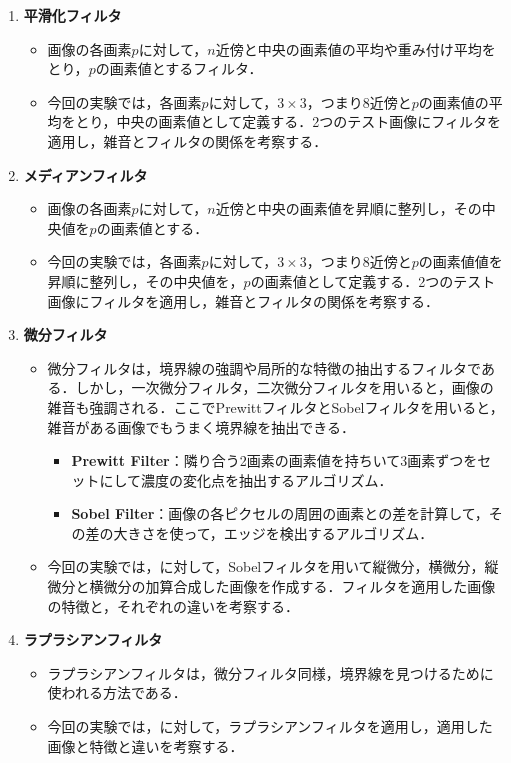 \begin{enumerate}
    \item \textbf{平滑化フィルタ}
          \begin{itemize}
              \item 画像の各画素\(p\)に対して，\(n\)近傍と中央の画素値の平均や重み付け平均をとり，\(p\)の画素値とするフィルタ．
              \item 今回の実験では，各画素\(p\)に対して，\(3\times 3\)，つまり8近傍と\(p\)の画素値の平均をとり，中央の画素値として定義する．2つのテスト画像にフィルタを適用し，雑音とフィルタの関係を考察する．
          \end{itemize}
    \item \textbf{メディアンフィルタ}
          \begin{itemize}
              \item 画像の各画素\(p\)に対して，\(n\)近傍と中央の画素値を昇順に整列し，その中央値を\(p\)の画素値とする．
              \item 今回の実験では，各画素\(p\)に対して，\(3\times 3\)，つまり8近傍と\(p\)の画素値値を昇順に整列し，その中央値を，\(p\)の画素値として定義する．2つのテスト画像にフィルタを適用し，雑音とフィルタの関係を考察する．
          \end{itemize}
    \item \textbf{微分フィルタ}
          \begin{itemize}
              \item 微分フィルタは，境界線の強調や局所的な特徴の抽出するフィルタである．しかし，一次微分フィルタ，二次微分フィルタを用いると，画像の雑音も強調される．ここでPrewittフィルタとSobelフィルタを用いると，雑音がある画像でもうまく境界線を抽出できる\cite[p.87]{画像処理}．
                    \begin{itemize}
                        \item \textbf{Prewitt Filter}：隣り合う2画素の画素値を持ちいて3画素ずつをセットにして濃度の変化点を抽出するアルゴリズム\cite[p.87]{画像処理}．
                        \item \textbf{Sobel Filter}：画像の各ピクセルの周囲の画素との差を計算して，その差の大きさを使って，エッジを検出するアルゴリズム．
                    \end{itemize}
              \item 今回の実験では，\originimg に対して，Sobelフィルタを用いて縦微分，横微分，縦微分と横微分の加算合成した画像を作成する．フィルタを適用した画像の特徴と，それぞれの違いを考察する．
          \end{itemize}
    \item \textbf{ラプラシアンフィルタ}
          \begin{itemize}
              \item ラプラシアンフィルタは，微分フィルタ同様，境界線を見つけるために使われる方法である．
              \item 今回の実験では，\originimg に対して，ラプラシアンフィルタを適用し，適用した画像と特徴と違いを考察する．
          \end{itemize}
\end{enumerate}
